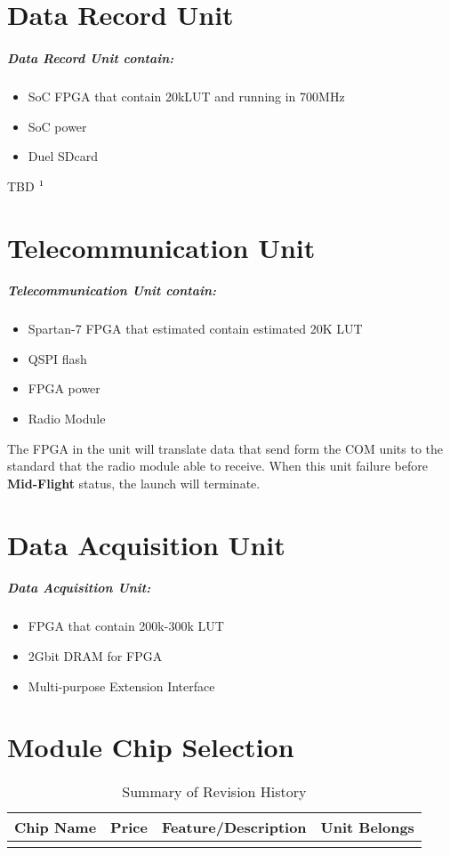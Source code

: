 \documentclass[12pt,article]{memoir}
\begin{document}
\section{Data Record Unit}
\subparagraph{Data Record Unit contain:}
\begin{itemize}
	\item SoC FPGA that contain 20kLUT and running in 700MHz
	\item SoC power
	\item Duel SDcard
\end{itemize}
TBD $\footnote{This unit will not be avaliable in the first version.}$
\section{Telecommunication Unit}
\subparagraph{Telecommunication Unit contain:}
\begin{itemize}
	\item Spartan-7 FPGA that estimated contain estimated 20K LUT
	\item QSPI flash
	\item FPGA power
	\item Radio Module
\end{itemize}
The FPGA in the unit will translate data that send form the COM units to the standard that the radio module able to receive. When this unit failure before \textbf{Mid-Flight} status, the launch will terminate.
\section{Data Acquisition Unit}
\subparagraph{Data Acquisition Unit:}
\begin{itemize}
	\item FPGA that contain 200k-300k LUT
	\item 2Gbit DRAM for FPGA
	\item Multi-purpose Extension Interface
\end{itemize}
\section{Module Chip Selection}
\begin{table}[H]
	\centering
	\begin{tabu}{ c | c | c | c }
		Chip Name & Price & Feature/Description & Unit Belongs\\ \hline
		 & & & \\
	\end{tabu}
	\caption{Summary of Revision History}
	\label{tab:slc}
\end{table}
\end{document}
